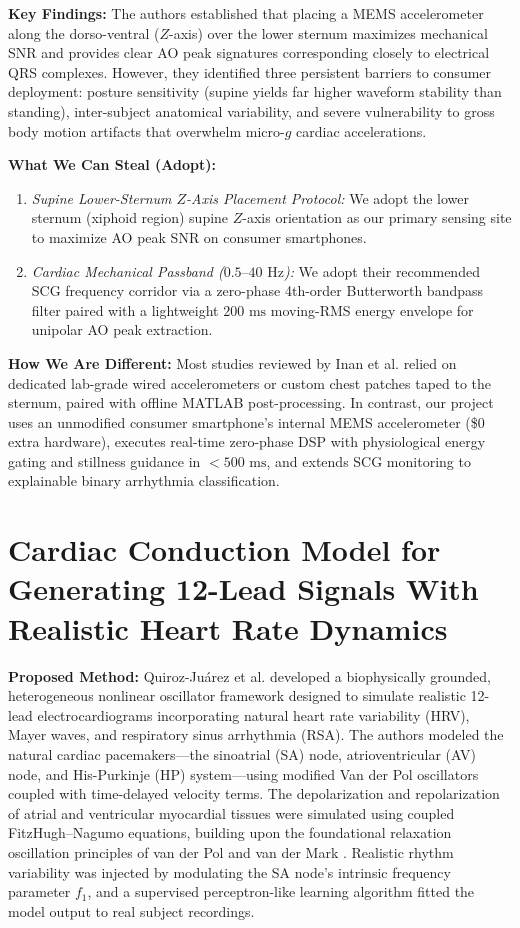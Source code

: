 \textbf{Key Findings:} The authors established that placing a MEMS accelerometer along the dorso-ventral ($Z$-axis) over the lower sternum maximizes mechanical SNR and provides clear AO peak signatures corresponding closely to electrical QRS complexes. However, they identified three persistent barriers to consumer deployment: posture sensitivity (supine yields far higher waveform stability than standing), inter-subject anatomical variability, and severe vulnerability to gross body motion artifacts that overwhelm micro-$g$ cardiac accelerations.

\textbf{What We Can Steal (Adopt):} 
\begin{enumerate}
    \item \textit{Supine Lower-Sternum $Z$-Axis Placement Protocol:} We adopt the lower sternum (xiphoid region) supine $Z$-axis orientation as our primary sensing site to maximize AO peak SNR on consumer smartphones.
    \item \textit{Cardiac Mechanical Passband ($0.5\text{--}40\text{ Hz}$):} We adopt their recommended SCG frequency corridor via a zero-phase 4th-order Butterworth bandpass filter paired with a lightweight $200\text{ ms}$ moving-RMS energy envelope for unipolar AO peak extraction.
\end{enumerate}

\textbf{How We Are Different:} Most studies reviewed by Inan et al. relied on dedicated lab-grade wired accelerometers or custom chest patches taped to the sternum, paired with offline MATLAB post-processing. In contrast, our project uses an unmodified consumer smartphone's internal MEMS accelerometer (\$0 extra hardware), executes real-time zero-phase DSP with physiological energy gating and stillness guidance in $<500\text{ ms}$, and extends SCG monitoring to explainable binary arrhythmia classification.

\newpage
\section{Cardiac Conduction Model for Generating 12-Lead Signals With Realistic Heart Rate Dynamics \cite{quiroz2018cardiac}}

\textbf{Proposed Method:} Quiroz-Ju{\'a}rez et al. \cite{quiroz2018cardiac} developed a biophysically grounded, heterogeneous nonlinear oscillator framework designed to simulate realistic 12-lead electrocardiograms incorporating natural heart rate variability (HRV), Mayer waves, and respiratory sinus arrhythmia (RSA). The authors modeled the natural cardiac pacemakers---the sinoatrial (SA) node, atrioventricular (AV) node, and His-Purkinje (HP) system---using modified Van der Pol oscillators coupled with time-delayed velocity terms. The depolarization and repolarization of atrial and ventricular myocardial tissues were simulated using coupled FitzHugh--Nagumo equations, building upon the foundational relaxation oscillation principles of van der Pol and van der Mark \cite{vanderpol1928}. Realistic rhythm variability was injected by modulating the SA node's intrinsic frequency parameter $f_1$, and a supervised perceptron-like learning algorithm fitted the model output to real subject recordings.

